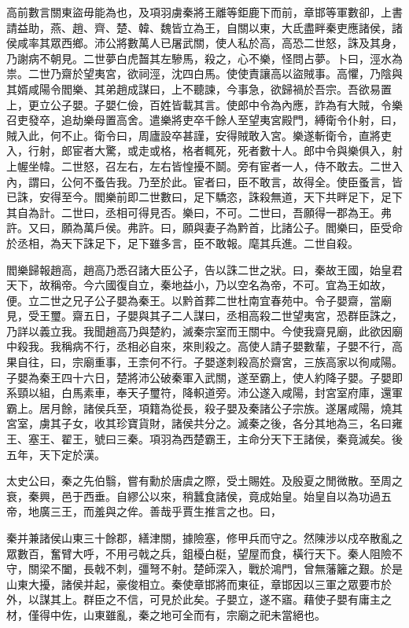 高前數言關東盜毋能為也，及項羽虜秦將王離等鉅鹿下而前，章邯等軍數卻，上書請益助，燕、趙、齊、楚、韓、魏皆立為王，自關以東，大氐盡畔秦吏應諸侯，諸侯咸率其眾西鄉。沛公將數萬人已屠武關，使人私於高，高恐二世怒，誅及其身，乃謝病不朝見。二世夢白虎齧其左驂馬，殺之，心不樂，怪問占夢。卜曰，涇水為祟。二世乃齋於望夷宮，欲祠涇，沈四白馬。使使責讓高以盜賊事。高懼，乃陰與其婿咸陽令閻樂、其弟趙成謀曰，上不聽諫，今事急，欲歸禍於吾宗。吾欲易置上，更立公子嬰。子嬰仁儉，百姓皆載其言。使郎中令為內應，詐為有大賊，令樂召吏發卒，追劫樂母置高舍。遣樂將吏卒千餘人至望夷宮殿門，縛衛令仆射，曰，賊入此，何不止。衛令曰，周廬設卒甚謹，安得賊敢入宮。樂遂斬衛令，直將吏入，行射，郎宦者大驚，或走或格，格者輒死，死者數十人。郎中令與樂俱入，射上幄坐幃。二世怒，召左右，左右皆惶擾不鬬。旁有宦者一人，侍不敢去。二世入內，謂曰，公何不蚤告我。乃至於此。宦者曰，臣不敢言，故得全。使臣蚤言，皆已誅，安得至今。閻樂前即二世數曰，足下驕恣，誅殺無道，天下共畔足下，足下其自為計。二世曰，丞相可得見否。樂曰，不可。二世曰，吾願得一郡為王。弗許。又曰，願為萬戶侯。弗許。曰，願與妻子為黔首，比諸公子。閻樂曰，臣受命於丞相，為天下誅足下，足下雖多言，臣不敢報。麾其兵進。二世自殺。

閻樂歸報趙高，趙高乃悉召諸大臣公子，告以誅二世之狀。曰，秦故王國，始皇君天下，故稱帝。今六國復自立，秦地益小，乃以空名為帝，不可。宜為王如故，便。立二世之兄子公子嬰為秦王。以黔首葬二世杜南宜春苑中。令子嬰齋，當廟見，受王璽。齋五日，子嬰與其子二人謀曰，丞相高殺二世望夷宮，恐群臣誅之，乃詳以義立我。我聞趙高乃與楚約，滅秦宗室而王關中。今使我齋見廟，此欲因廟中殺我。我稱病不行，丞相必自來，來則殺之。高使人請子嬰數輩，子嬰不行，高果自往，曰，宗廟重事，王柰何不行。子嬰遂刺殺高於齋宮，三族高家以徇咸陽。子嬰為秦王四十六日，楚將沛公破秦軍入武關，遂至霸上，使人約降子嬰。子嬰即系頸以組，白馬素車，奉天子璽符，降軹道旁。沛公遂入咸陽，封宮室府庫，還軍霸上。居月餘，諸侯兵至，項籍為從長，殺子嬰及秦諸公子宗族。遂屠咸陽，燒其宮室，虜其子女，收其珍寶貨財，諸侯共分之。滅秦之後，各分其地為三，名曰雍王、塞王、翟王，號曰三秦。項羽為西楚霸王，主命分天下王諸侯，秦竟滅矣。後五年，天下定於漢。

太史公曰，秦之先伯翳，嘗有勳於唐虞之際，受土賜姓。及殷夏之閒微散。至周之衰，秦興，邑于西垂。自繆公以來，稍蠶食諸侯，竟成始皇。始皇自以為功過五帝，地廣三王，而羞與之侔。善哉乎賈生推言之也。曰，

秦并兼諸侯山東三十餘郡，繕津關，據險塞，修甲兵而守之。然陳涉以戍卒散亂之眾數百，奮臂大呼，不用弓戟之兵，鉏櫌白梃，望屋而食，橫行天下。秦人阻險不守，關梁不闔，長戟不刺，彊弩不射。楚師深入，戰於鴻門，曾無藩籬之艱。於是山東大擾，諸侯并起，豪俊相立。秦使章邯將而東征，章邯因以三軍之眾要市於外，以謀其上。群臣之不信，可見於此矣。子嬰立，遂不寤。藉使子嬰有庸主之材，僅得中佐，山東雖亂，秦之地可全而有，宗廟之祀未當絕也。

